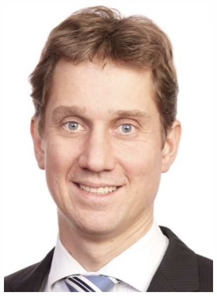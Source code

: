 \documentclass[12pt]{report}
\theoremstyle{dotless}
\theoremstyle{definition}
\begin{document}
\begin{figure}[ht]
	\centering
	\includegraphics[width=.8\textwidth]{Bilder/Korbinian.png}
\end{figure}
\end{document}
